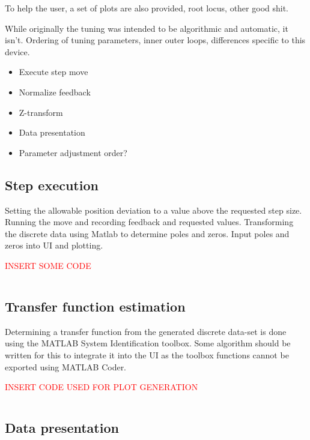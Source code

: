 To help the user, a set of plots are also provided, root locus, other good shit.

While originally the tuning was intended to be algorithmic and automatic, it isn't.
Ordering of tuning parameters, inner outer loops, differences specific to this device. 

\begin{itemize}
	\item Execute step move
	\item Normalize feedback
	\item Z-transform
	\item Data presentation
	\item Parameter adjustment order? 
\end{itemize}

\subsection{Step execution}

Setting the allowable position deviation to a value above the requested step size. 
Running the move and recording feedback and requested values. 
Transforming the discrete data using Matlab to determine poles and zeros. 
Input poles and zeros into UI and plotting. 

\textcolor{red}{INSERT SOME CODE}
\lstset{style=python}
\begin{lstlisting}[language=python]
\end{lstlisting}

\subsection{Transfer function estimation}

Determining a transfer function from the generated discrete data-set is done using the MATLAB System Identification toolbox. 
Some algorithm should be written for this to integrate it into the UI as the toolbox functions cannot be exported using MATLAB Coder. 

\textcolor{red}{INSERT CODE USED FOR PLOT GENERATION}
\lstset{style=matlab}
\begin{lstlisting}[language=matlab]
\end{lstlisting}

\subsection{Data presentation}

